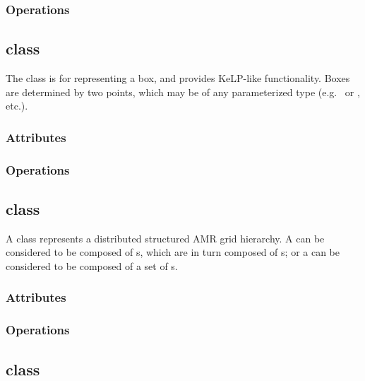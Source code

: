 \documentclass{article}
\begin{document}
\subsubsection{Operations}

\subsection{ class}

The  class is for representing a box, and provides KeLP-like functionality.
Boxes are determined by two points, which may be of any parameterized type
(e.g.~ or , etc.).


\subsubsection{Attributes}

\subsubsection{Operations}

\subsection{ class}

A  class represents a distributed structured AMR grid
hierarchy.  A  can be considered to be composed of
s, which are in turn composed of s; or a 
can be considered to be composed of a set of s.


\subsubsection{Attributes}

\subsubsection{Operations}

\subsection{ class}
\end{document}

